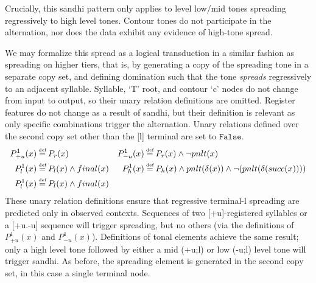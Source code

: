 \documentclass{article}
\newcommand\myeq{\mathrel{\stackrel{\makebox[0pt]{\mbox{\normalfont\tiny def}}}{=}}}
\begin{document}
\begin{center}
\end{center}
Crucially, this sandhi pattern only applies to level low/mid tones spreading regressively to high level tones. Contour tones do not participate in the alternation, nor does the data exhibit any evidence of high-tone spread. \par
We may formalize this spread as a logical transduction in a similar fashion as spreading on higher tiers, that is, by generating a copy of the spreading tone in a separate copy set, and defining domination such that the tone \emph{spreads} regressively to an adjacent syllable. Syllable, `T' root, and contour `c' nodes do not change from input to output, so their unary relation definitions are omitted. Register features do not change as a result of sandhi, but their definition is relevant as only specific combinations trigger the alternation. Unary relations defined over the second copy set other than the [l] terminal are set to $\mathtt{False}$.  
\begin{equation}
\begin{aligned}
P^{1}_{+u}(x)&\myeq P_{r}(x) & P^{1}_{-u}(x)&\myeq P_{r}(x)\land \neg pnlt(x) \\
P^{1}_{l}(x)&\myeq P_{l}(x)\land final(x) & P^{1}_{h}(x)&\myeq P_{h}(x)\land pnlt(\delta(x))\land \neg(pnlt(\delta(succ(x)))) \\
P^{1}_{l}(x)&\myeq P_{l}(x)\land final(x) \\
\end{aligned}
\end{equation}
These unary relation definitions ensure that regressive terminal-l spreading are predicted only in observed contexts. Sequences of two [+u]-registered syllables or a [+u.-u] sequence will trigger spreading, but no others (via the definitions of $P^{1}_{+u}(x)$ and $P^{1}_{-u}(x)$). Definitions of tonal elements achieve the same result; only a high level tone followed by either a mid (+u;l) or low (-u;l) level tone will trigger sandhi. As before, the spreading element is generated in the second copy set, in this case a single terminal node.\par
\end{document}
